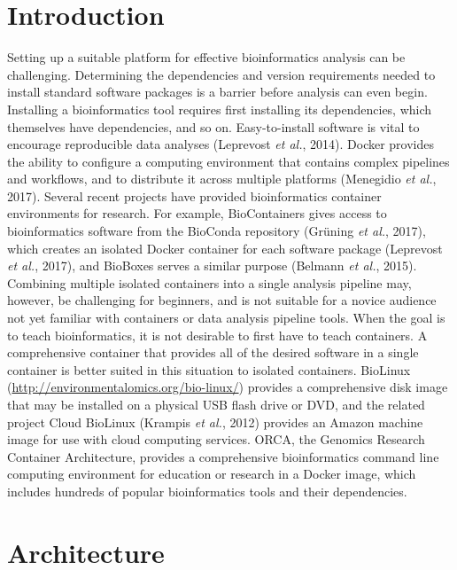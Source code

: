 \documentclass{bioinfo}
\begin{document}
\maketitle

\section{Introduction}

Setting up a suitable platform for effective bioinformatics analysis can be challenging. Determining the dependencies and version requirements needed to install standard software packages is a barrier before analysis can even begin. Installing a bioinformatics tool requires first installing its dependencies, which themselves have dependencies, and so on. Easy-to-install software is vital to encourage reproducible data analyses (Leprevost \emph{et al.}, 2014). Docker provides the ability to configure a computing environment that contains complex pipelines and workflows, and to distribute it across multiple platforms (Menegidio \emph{et al.}, 2017). Several recent projects have provided bioinformatics container environments for research. For example, BioContainers gives access to bioinformatics software from the BioConda repository (Gr\"uning \emph{et al.}, 2017), which creates an isolated Docker container for each software package (Leprevost \emph{et al.}, 2017), and BioBoxes serves a similar purpose (Belmann \emph{et al.}, 2015). Combining multiple isolated containers into a single analysis pipeline may, however, be challenging for beginners, and is not suitable for a novice audience not yet familiar with containers or data analysis pipeline tools. When the goal is to teach bioinformatics, it is not desirable to first have to teach containers. A comprehensive container that provides all of the desired software in a single container is better suited in this situation to isolated containers. BioLinux (\url{http://environmentalomics.org/bio-linux/}) provides a comprehensive disk image that may be installed on a physical USB flash drive or DVD, and the related project Cloud BioLinux (Krampis \emph{et al.}, 2012) provides an Amazon machine image for use with cloud computing services. ORCA, the Genomics Research Container Architecture, provides a comprehensive bioinformatics command line computing environment for education or research in a Docker image, which includes hundreds of popular bioinformatics tools and their dependencies.

\section{Architecture}
\end{document}
